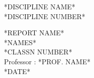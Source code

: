 
\begin{titlepage}

\Large



\begin{center}

\textsc{*DISCIPLINE NAME*\\[0.5\baselineskip]
*DISCIPLINE NUMBER*\\[0.5\baselineskip]
}

\vspace{3cm}

\huge{\textsc{*REPORT NAME*}}\\[0.5\baselineskip]
\bigskip
\bigskip
\bigskip
\normalsize
*NAMES*\\*CLASSN NUMBER*\\Professor : *PROF. NAME*
{\normalsize \textsc{}}\\



\vfill
\LARGE{\textsc{*DATE*}}\\

\end{center}

\end{titlepage}
